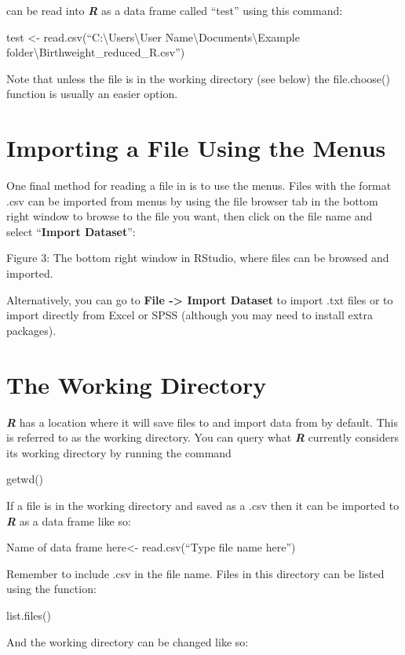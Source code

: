\documentclass[
]{book}
\begin{document}
can be read into \textbf{\emph{R}} as a data frame called ``test'' using this command:

test \textless- read.csv(``C:\textbackslash Users\textbackslash User Name\textbackslash Documents\textbackslash Example folder\textbackslash Birthweight\_reduced\_R.csv'')

Note that unless the file is in the working directory (see below) the file.choose() function is usually an easier option.

\section{Importing a File Using the Menus}\label{importing-a-file-using-the-menus}

One final method for reading a file in is to use the menus. Files with the format .csv can be imported from menus by using the file browser tab in the bottom right window to browse to the file you want, then click on the file name and select ``\textbf{Import Dataset}'':

Figure 3: The bottom right window in RStudio, where files can be browsed and imported.

Alternatively, you can go to \textbf{File -\textgreater{} Import Dataset} to import .txt files or to import directly from Excel or SPSS (although you may need to install extra packages).

\section{The Working Directory}\label{the-working-directory}

\textbf{\emph{R}} has a location where it will save files to and import data from by default. This is referred to as the working directory. You can query what \textbf{\emph{R}} currently considers its working directory by running the command

getwd()

If a file is in the working directory and saved as a .csv then it can be imported to \textbf{\emph{R}} as a data frame like so:

Name of data frame here\textless- read.csv(``Type file name here'')

Remember to include .csv in the file name. Files in this directory can be listed using the function:

list.files()

And the working directory can be changed like so:
\end{document}
